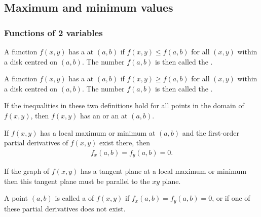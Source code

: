 \documentclass{article}
\begin{document}
\subsection{Maximum and minimum values}


\subsubsection{Functions of 2 variables}

\begin{definition}
    A function $f(x,y)$ has a  at $(a,b)$ if $f(x,y)\leq f(a,b)$
    for all $(x,y)$ within a disk centred on $(a,b)$. The number $f(a,b)$
    is then called the .
\end{definition}
\begin{definition}
    A function $f(x,y)$ has a  at $(a,b)$ if $f(x,y)\geq f(a,b)$
    for all $(x,y)$ within a disk centred on $(a,b)$. The number $f(a,b)$
    is then called the .
\end{definition}
\begin{definition}
    If the inequalities in these two definitions hold for all points in the
    domain of $f(x,y)$, then $f(x,y)$ has an  or an
     at $(a,b)$.
\end{definition}
\begin{theorem}
    If $f(x,y)$ has a local maximum or minimum at $(a,b)$ and the first-order
    partial derivatives of $f(x,y)$ exist there, then
    \begin{align*}
        f_x(a,b) = f_y(a,b) = 0.
    \end{align*}
\end{theorem}
\begin{lemma}
    If the graph of $f(x,y)$ has a tangent plane at a local maximum or minimum
    then this tangent plane must be parallel to the $xy$ plane.
\end{lemma}
\begin{definition}
    A point $(a,b)$ is called a  of $f(x,y)$ if
    $f_x(a,b)=f_y(a,b)=0$, or if one of these partial derivatives does not exist.
\end{definition}
\end{document}
